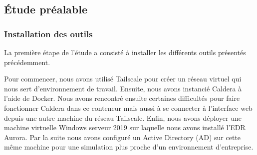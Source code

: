 \documentclass[12pt,letterpaper]{article}
\begin{document}
\subsection{Étude préalable}
\subsubsection{Installation des outils}

La première étape de l'étude a consisté à installer les différents outils présentés précédemment.

\bigskip

Pour commencer, nous avons utilisé Tailscale pour créer un réseau virtuel qui nous sert d'environnement de travail.
Ensuite, nous avons instancié Caldera à l'aide de Docker.
Nous avons rencontré ensuite certaines difficultés pour faire fonctionner Caldera dans ce conteneur mais aussi à se connecter à l'interface web depuis une autre machine du réseau Tailscale.
Enfin, nous avons déployer une machine virtuelle Windows serveur 2019 sur laquelle nous avons installé l'EDR Aurora.
Par la suite nous avons configuré un Active Directory (AD) sur cette même machine pour une simulation plus proche d'un environnement d'entreprise.
\end{document}
